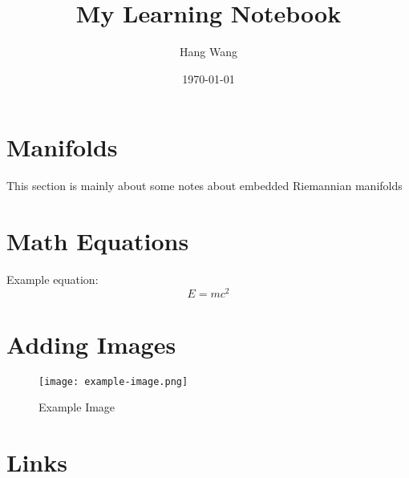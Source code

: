 \documentclass{article}
\title{My Learning Notebook}
\author{Hang Wang}
\date{\today}
\begin{document}
\maketitle

\section{Manifolds}
This section is mainly about some notes about embedded Riemannian manifolds
\section{Math Equations}
Example equation:
\[
E = mc^2
\]

\section{Adding Images}
\begin{figure}[h]
    \centering
    \texttt{[image: example-image.png]}
    \caption{Example Image}
\end{figure}

\section{Links}
\end{document}

